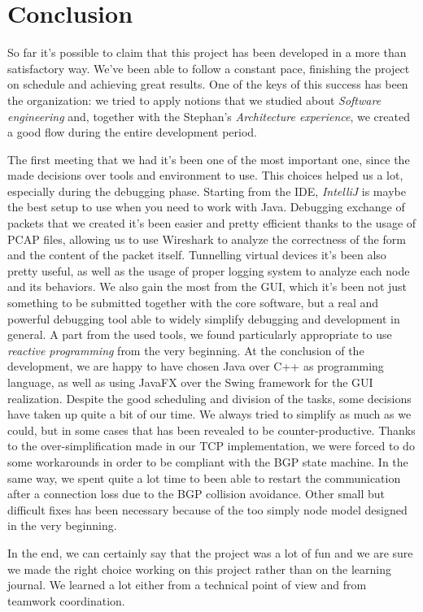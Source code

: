 \chapter{Conclusion}

So far it's possible to claim that this project has been developed in a more than satisfactory way.
We've been able to follow a constant pace, finishing the project on schedule and achieving great results.
One of the keys of this success has been the organization: we tried to apply notions that we studied about \textit{Software engineering} and, together with the Stephan's \textit{Architecture experience}, we created a good flow during the entire development period.

The first meeting that we had it's been one of the most important one, since the made decisions over tools and environment to use. This choices helped us a lot, especially during the debugging phase. Starting from the IDE, \textit{IntelliJ} is maybe the best setup to use when you need to work with Java. Debugging exchange of packets that we created it's been easier and pretty efficient thanks to the usage of PCAP files, allowing us to use Wireshark to analyze the correctness of the form and the content of the packet itself.
Tunnelling virtual devices it's been also pretty useful, as well as the usage of proper logging system to analyze each node and its behaviors. We also gain the most from the GUI, which it's been not just something to be submitted together with the core software, but a real and powerful debugging tool able to widely simplify debugging and development in general.
A part from the used tools, we found particularly appropriate to use \textit{reactive programming} from the very beginning. At the conclusion of the development, we are happy to have chosen Java over C++ as programming language, as well as using JavaFX over the Swing framework for the GUI realization.
Despite the good scheduling and division of the tasks, some decisions have taken up quite a bit of our time. We always tried to simplify as much as we could, but in some cases that has been revealed to be counter-productive. Thanks to the over-simplification made in our TCP implementation, we were forced to do some workarounds in order to be compliant with the BGP state machine. In the same way, we spent quite a lot time to been able to restart the communication after a connection loss due to the BGP collision avoidance. Other small but difficult fixes has been necessary because of the too simply node model designed in the very beginning.

In the end, we can certainly say that the project was a lot of fun and we are sure we made the right choice working on this project rather than on the learning journal. We learned a lot either from a technical point of view and from teamwork coordination.